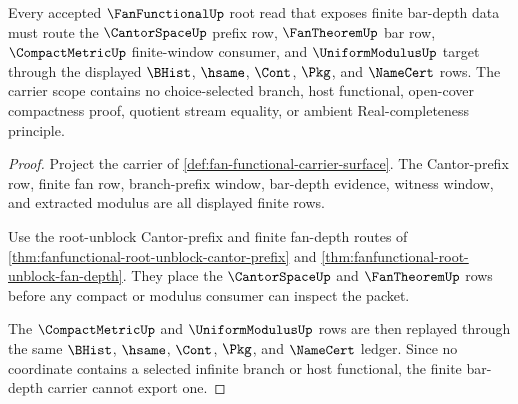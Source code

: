 \begin{theorem}
\label{thm:fanfunctional-bar-scope-obligations}
Every accepted $\FanFunctionalUp$ root read that exposes finite bar-depth data must route the $\CantorSpaceUp$ prefix row, $\FanTheoremUp$ bar row, $\CompactMetricUp$ finite-window consumer, and $\UniformModulusUp$ target through the displayed $\BHist$, $\hsame$, $\Cont$, $\Pkg$, and $\NameCert$ rows. The carrier scope contains no choice-selected branch, host functional, open-cover compactness proof, quotient stream equality, or ambient Real-completeness principle.
\end{theorem}
\begin{proof}
Project the carrier of \autoref{def:fan-functional-carrier-surface}. The Cantor-prefix row, finite fan row, branch-prefix window, bar-depth evidence, witness window, and extracted modulus are all displayed finite rows.

Use the root-unblock Cantor-prefix and finite fan-depth routes of \autoref{thm:fanfunctional-root-unblock-cantor-prefix} and \autoref{thm:fanfunctional-root-unblock-fan-depth}. They place the $\CantorSpaceUp$ and $\FanTheoremUp$ rows before any compact or modulus consumer can inspect the packet.

The $\CompactMetricUp$ and $\UniformModulusUp$ rows are then replayed through the same $\BHist$, $\hsame$, $\Cont$, $\Pkg$, and $\NameCert$ ledger. Since no coordinate contains a selected infinite branch or host functional, the finite bar-depth carrier cannot export one.
\end{proof}

